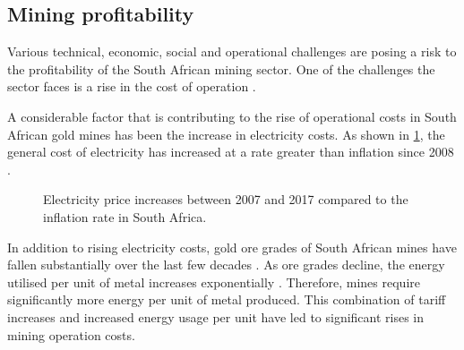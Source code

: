	\subsection{Mining profitability}
	 	Various technical, economic, social and operational challenges are posing a risk to the profitability of the South African mining sector. One of the challenges the sector faces is a rise in the cost of operation \cite{neingo2016trends}.
	 	\par
		A considerable factor that is contributing to the rise of operational costs in South African gold mines has been the increase in electricity costs. As shown in \cref{fig: Eskom tariffs}, the general cost of electricity has increased at a rate greater than inflation since 2008 \cite{Eskom2013Tariffs}.
		\begin{figure}[h]
			\centering
			\fbox{}
			\caption[Electricity price increases between 2007 and 2017 compared to the inflation rate in South Africa..]{Electricity price increases between 2007 and 2017 \cite{Eskom2013Tariffs} compared to the inflation rate in South Africa\protect\footnotemark[1]. }
			\label{fig: Eskom tariffs}
		\end{figure}
		\par
		In addition to rising electricity costs, gold ore grades of South African mines have fallen substantially over the last few decades \cite{mudd2007global}. As ore grades decline, the energy utilised per unit of metal increases exponentially \cite{muller2010numerical}. Therefore, mines require significantly more energy per unit of metal produced. This combination of tariff increases and increased energy usage per unit have led to significant rises in mining operation costs.
